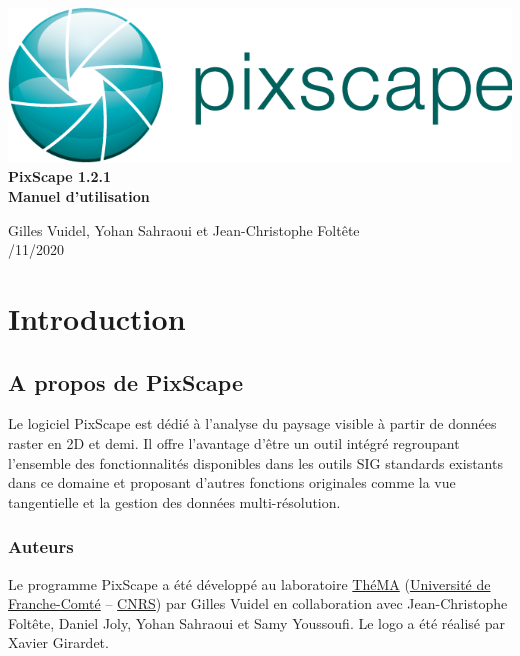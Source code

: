 \documentclass{report}
\begin{document}
 \begin{titlepage}
	
	\centering
	\includegraphics[scale=0.5]{img/logo.png}\\
	
	\bigskip
	\bigskip
	\bigskip	
	{\Huge
		\bfseries
		PixScape 1.2.1\\
		\bigskip
		Manuel d’utilisation\\
	}
	\bigskip
	\bigskip
	\bigskip
	\bigskip
	\bigskip
	
	{\Large		
		Gilles Vuidel, Yohan Sahraoui et Jean-Christophe Foltête\\
		/11/2020\\
	}
	
\end{titlepage}

\setcounter{tocdepth}{2}
\tableofcontents

\pagebreak

\chapter{Introduction}

\section{A propos de PixScape}

Le logiciel PixScape est dédié à l'analyse du paysage visible à partir de données raster en 2D et demi. Il offre l’avantage d’être un outil intégré regroupant l’ensemble des fonctionnalités disponibles dans les outils SIG standards existants dans ce domaine et proposant d’autres fonctions originales comme la vue tangentielle et la gestion des données multi-résolution.


\subsection{Auteurs}
Le programme PixScape a été développé au laboratoire \href{http://thema.univ-fcomte.fr}{ThéMA} (\href{http://www.univ-fcomte.fr}{Université de Franche-Comté} – \href{http://www.cnrs.fr}{CNRS}) par Gilles Vuidel en collaboration avec Jean-Christophe Foltête, Daniel Joly, Yohan Sahraoui et Samy Youssoufi. Le logo a été réalisé par Xavier Girardet.
\end{document}
